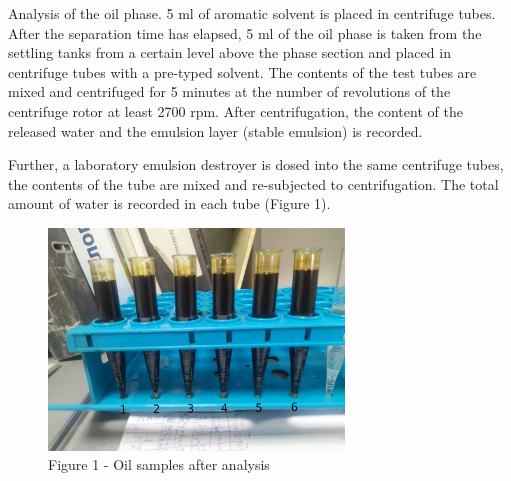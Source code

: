\begin{multicols}{2}
Analysis of the oil phase. 5 ml of aromatic solvent is placed in
centrifuge tubes. After the separation time has elapsed, 5 ml of the oil
phase is taken from the settling tanks from a certain level above the
phase section and placed in centrifuge tubes with a pre-typed solvent.
The contents of the test tubes are mixed and centrifuged for 5 minutes
at the number of revolutions of the centrifuge rotor at least 2700 rpm.
After centrifugation, the content of the released water and the emulsion
layer (stable emulsion) is recorded.

Further, a laboratory emulsion destroyer is dosed into the same
centrifuge tubes, the contents of the tube are mixed and re-subjected to
centrifugation. The total amount of water is recorded in each tube
(Figure 1).
\end{multicols}

\begin{figure}[H]
	\centering
	\includegraphics[width=0.7\textwidth]{assets/1075}
	\caption*{Figure 1 - Oil samples after analysis}
\end{figure}

